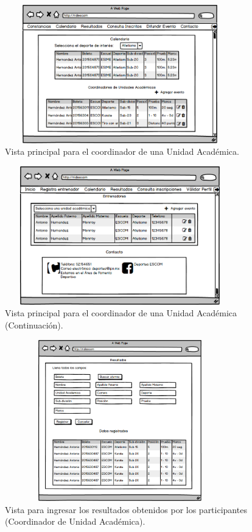 		\begin{figure} [hbt!]
			\centering
			\includegraphics[width=10cm, height=6cm]{Imagenes/Nuevos/P8_Inicio_CoordUA}
			\caption{Vista principal para el coordinador de una Unidad Académica.}
			\label{principalcoord}
		\end{figure}
	
		\begin{figure} [hbt!]
			\centering
			\includegraphics[width=10cm, height=6cm]{Imagenes/Nuevos/P9_Inicio_CoordUA1}
			\caption{Vista principal para el coordinador de una Unidad Académica (Continuación).}
			\label{principalcoord1}
		\end{figure}
	\pagebreak
		
		\begin{figure} [hbt!] 
			\centering
			\includegraphics[width=10cm, height=7cm]{Imagenes/Nuevos/P10_Ingresa_resultados}
			\caption{Vista para ingresar los resultados obtenidos por los participantes (Coordinador de Unidad Académica).}
			\label{ingresaresultados}
		\end{figure}
		
